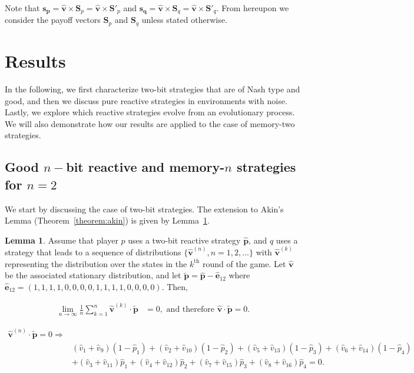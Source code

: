 \documentclass{article}
\theoremstyle{definition}
\newtheorem{lemma}[theorem]{Lemma}
\begin{document}
Note that \(\mathbf{s_{p}} = \mathbf{\hat{v}} \times \mathbf{S}_{p} =
\mathbf{\hat{v}} \times \mathbf{S}'_{p}\) and \(\mathbf{s_{q}} =\mathbf{\hat{v}}
\times \mathbf{S}_{q} = \mathbf{\hat{v}} \times \mathbf{S}'_{q}\). From
hereupon we consider the payoff vectors \(\mathbf{S}_{p}\) and
\(\mathbf{S}_{q}\) unless stated otherwise.

\section{Results}\label{section:results}

In the following, we first characterize two-bit strategies that
are of Nash type and good, and then we discuss pure reactive strategies in
environments with noise. Lastly, we explore which reactive strategies evolve
from an evolutionary process. We will also demonstrate how our results
are applied to the case of memory-two strategies.

\subsection{Good \(n-\)bit reactive and memory-\(n\) strategies for
\(n=2\)}\label{section:good_nash_strategies}

We start by discussing the case of two-bit strategies. The extension to Akin's
Lemma (Theorem~\ref{theorem:akin}) is given by Lemma~\ref{lemma:akin_extended}.

\begin{lemma}\label{lemma:akin_extended}
  Assume that player \(p\) uses a two-bit reactive strategy \(\mathbf{\hat{p}}\),
  and \(q\) uses a strategy that leads to a sequence
  of distributions \(\{\mathbf{\hat{v}}^{(n)}, n = 1, 2, ...\}\) with
  \(\mathbf{\hat{v}}^{(k)}\) representing the distribution over the states in the
  \(k^{\text{th}}\) round of the game. Let \(\mathbf{\hat{v}}\) be the associated
  stationary distribution, and let \(\mathbf{\tilde{p}} = \mathbf{\hat{p}} \!- \!\mathbf{\hat{e}}_{1 2}\)
  where \(\mathbf{\hat{e}}_{1 2} = (1, 1, 1, 1, \allowbreak 0,
  0, 0, 0, 1, 1, 1, 1, 0, 0, 0, 0)\). Then,

  \begin{align*}
    \lim_{n \rightarrow \infty} \frac{1}{n} \sum_{k=1}^{n} \mathbf{\hat{v}}^{(k)} \cdot\mathbf{\tilde{p}} & = 0, \text{ and therefore } \mathbf{\hat{v}} \cdot \mathbf{\tilde{p}} = 0.
  \end{align*}

  \begin{align}\label{eq:akin_extended}
  \mathbf{\hat{v}}^{(n)} \cdot \mathbf{\tilde{p}} = 0 \Rightarrow & \nonumber \\
  & (\hat{v}_{1} + \hat{v}_{9}) (1 \!- \!\hat{p}_1) + (\hat{v}_{2} + \hat{v}_{10}) (1 \!- \!\hat{p}_2)  + (\hat{v}_{5} + \hat{v}_{13}) (1 \!- \!\hat{p}_3) + (\hat{v}_{6} + \hat{v}_{14}) (1 \!- \!\hat{p}_4) \nonumber \\
  & + (\hat{v}_{3} + \hat{v}_{11})\hat{p}_1  + (\hat{v}_{4} + \hat{v}_{12})\hat{p}_2 + (\hat{v}_{7} + \hat{v}_{15}) \hat{p}_3 + (\hat{v}_{8} + \hat{v}_{16}) \hat{p}_4 = 0.
  \end{align}
\end{lemma}
\end{document}
